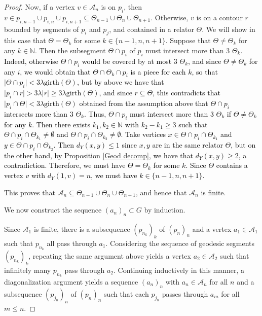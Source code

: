 \documentclass{article}[11pt]
\newcommand{\N}{\mathbb{N}}
\newcommand{\girth}{\mathrm{girth}}
\begin{document}
{\begin{proof}
    Now, if a vertex $v \in \mathcal{A}_n$ is on $p_i$, then $v \in p_{i,n-1} \cup p_{i,n} \cup p_{i,n+1} \subseteq \Theta_{n-1} \cup \Theta_{n} \cup \Theta_{n+1}$. Otherwise, $v$ is on a contour $r$ bounded by segments of $p_i$ and $p_j$, and contained in a relator $\Theta$. We will show in this case that $\Theta = \Theta_k$ for some $k \in \{n-1,n,n+1\}$. Suppose that $\Theta \neq \Theta_k$ for any $k \in \N$. Then the subsegment $\Theta \cap p_i$ of $p_i$ must intersect more than 3 $\Theta_k$. \textcolor{black}{Indeed, otherwise $\Theta \cap p_i$ would be covered by at most 3 $\Theta_k$, and since  $\Theta \neq \Theta_k$ for any $i$, we would obtain that $\Theta \cap \Theta_k \cap p_i$ is a piece for each $k$, so that $\vert \Theta \cap p_i \vert < 3 \lambda \girth(\Theta)$, but by above we have that $\vert p_i \cap r \vert > 3 \lambda \vert r \vert \geq 3 \lambda \girth(\Theta)$, and since $r \subseteq \Theta$, this contradicts that $\vert p_i \cap \Theta \vert < 3 \lambda \mathrm{girth}(\Theta)$ obtained from the assumption above that $\Theta \cap p_i$ intersects more than 3 $\Theta_k$. Thus, $\Theta \cap p_i$ must intersect more than 3 $\Theta_k$ if $\Theta \neq \Theta_k$ for any $k$. Then there exists $k_1, k_2 \in \N$ with $k_2 - k_1 \geq 3$ such that $ \Theta \cap p_i \cap \Theta_{k_1} \neq \emptyset$ and $ \Theta \cap p_i \cap \Theta_{k_2} \neq \emptyset$. Take vertices $x \in \Theta \cap p_i \cap \Theta_{k_1}$ and $y \in \Theta \cap p_i \cap \Theta_{k_2}$. Then $d_Y(x,y) \leq 1$ since $x,y$ are in the same relator $\Theta$, but on the other hand, by Proposition \ref{Geod decomp}, we have that $d_Y(x,y) \geq 2$, a contradiction. Therefore, we must have $\Theta = \Theta_k$ for some $k$. Since $\Theta$ contains a vertex $v$ with $d_Y(1,v) = n$, we must have $k \in \{n-1,n,n+1\}$. }
    
    This proves that $\mathcal{A}_n \subseteq \Theta_{n-1} \cup \Theta_n \cup \Theta_{n+1}$, and hence that $\mathcal{A}_n$ is finite. 

    We now construct the sequence $(a_n)_n \subset G$ by induction. 

    Since $\mathcal{A}_1$ is finite, there is a subsequence $(p_{n_k})_k$ of $(p_n)_n$ and a vertex $a_1 \in \mathcal{A}_1$ such that $p_{n_k}$ all pass through $a_1$. Considering the sequence of geodesic segments $(p_{n_k})_k$, repeating the same argument above yields a vertex $a_2 \in \mathcal{A}_2$ such that infinitely many $p_{n_k}$ pass through $a_2$. Continuing inductively in this manner, a diagonalization argument yields a sequence $(a_n)_n$ with $a_n \in \mathcal{A}_n$ for all $n$ and a subsequence $(p_{j_n})_n$ of $(p_n)_n$ such that each $p_{j_n}$ passes through $a_m$ for all $m \leq n$. 
    

\end{proof}}
\end{document}

